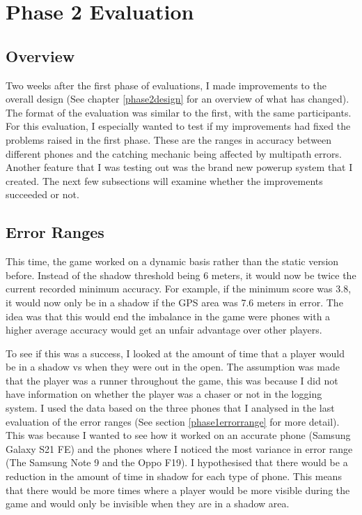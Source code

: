 \documentclass{l4proj}
\begin{document}
\chapter{Phase 2 Evaluation}
\label{phase2evaluation}

\section{Overview}
Two weeks after the first phase of evaluations, I made improvements to the overall design (See chapter \ref{phase2design} for an overview
of what has changed). The format of the evaluation was similar to the first, with the same participants. For this evaluation, I especially
wanted to test if my improvements had fixed the problems raised in the first phase. These are the ranges in accuracy between different
phones and the catching mechanic being affected by multipath errors. Another feature that I was testing out was the brand new powerup
system that I created. The next few subsections will examine whether the improvements succeeded or not.

\section{Error Ranges}
This time, the game worked on a dynamic basis rather than the static version before. Instead of the shadow threshold being
6 meters, it would now be twice the current recorded minimum accuracy. For example, if the minimum score was 3.8, it would now
only be in a shadow if the GPS area was 7.6 meters in error. The idea was that this would end the imbalance in the game were
phones with a higher average accuracy would get an unfair advantage over other players.

To see if this was a success, I looked at the amount of time that a player would be in a shadow vs when they were out in the
open. The assumption was made that the player was a runner throughout the game, this was because I did not have
information on whether the player was a chaser or not in the logging system. I used the data based on the three phones that I 
analysed in the last evaluation of the error ranges (See section \ref{phase1errorrange} for more detail). This was because I wanted
to see how it worked on an accurate phone (Samsung Galaxy S21 FE) and the phones where I noticed the most variance in error range (The Samsung Note 9 and the Oppo F19).
I hypothesised that there would be a reduction in the amount of time in shadow for each type of phone. This means that there would be
more times where a player would be more visible during the game and would only be invisible when they are in a shadow area.
\end{document}
